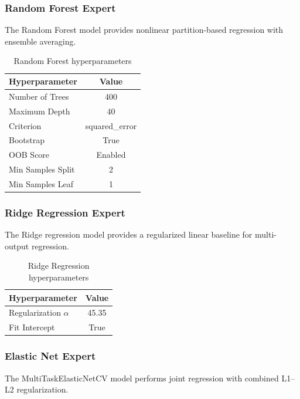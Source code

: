 \documentclass{customIEEEsingle}
\begin{document}
	\subsubsection{Random Forest Expert}
	
	The Random Forest model provides nonlinear partition-based regression with ensemble averaging.
	
	\begin{table}[htbp]
		\centering
		\caption{Random Forest hyperparameters}
		\label{tab:rf_params}
		\begin{tabular}{|l|c|}
			\hline
			Hyperparameter & Value \\
			\hline
			Number of Trees & 400 \\
			Maximum Depth & 40 \\
			Criterion & squared\_error \\
			Bootstrap & True \\
			OOB Score & Enabled \\
			Min Samples Split & 2 \\
			Min Samples Leaf & 1 \\
			\hline
		\end{tabular}
	\end{table}
	
	\subsubsection{Ridge Regression Expert}
	
	The Ridge regression model provides a regularized linear baseline for multi-output regression.
	
	\begin{table}[htbp]
		\centering
		\caption{Ridge Regression hyperparameters}
		\label{tab:ridge_params}
		\begin{tabular}{|l|c|}
			\hline
			Hyperparameter & Value \\
			\hline
			Regularization $\alpha$ & 45.35 \\
			Fit Intercept & True \\
			\hline
		\end{tabular}
	\end{table}
	
	\subsubsection{Elastic Net Expert}
	
	The MultiTaskElasticNetCV model performs joint regression with combined L1–L2 regularization.
	
\end{document}
